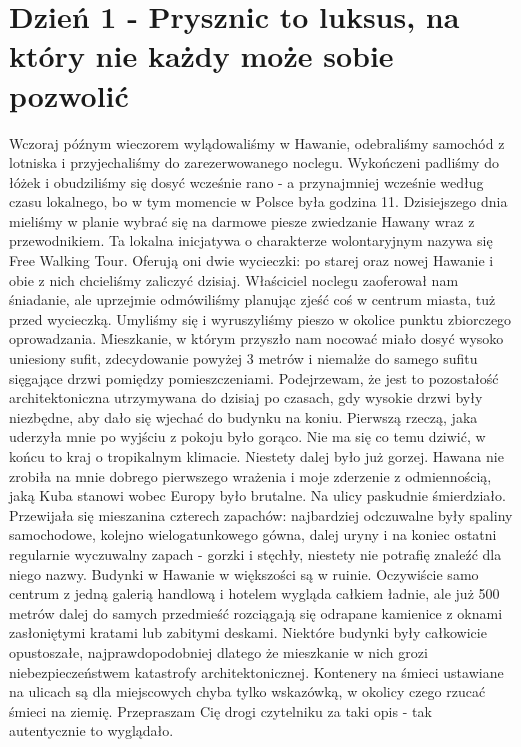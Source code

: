 
\chapter[Prysznic to luksus, na który nie każdy może sobie pozwolić]{Dzień 1 - Prysznic to luksus, na który nie każdy może sobie pozwolić}

Wczoraj późnym wieczorem wylądowaliśmy w Hawanie, odebraliśmy samochód z lotniska i przyjechaliśmy do zarezerwowanego noclegu.
Wykończeni padliśmy do łóżek i obudziliśmy się dosyć wcześnie rano - a przynajmniej wcześnie według czasu lokalnego, bo w tym momencie w Polsce była godzina 11.
Dzisiejszego dnia mieliśmy w planie wybrać się na darmowe piesze zwiedzanie Hawany wraz z przewodnikiem.
Ta lokalna inicjatywa o charakterze wolontaryjnym nazywa się Free Walking Tour.
Oferują oni dwie wycieczki: po starej oraz nowej Hawanie i obie z nich chcieliśmy zaliczyć dzisiaj.
Właściciel noclegu zaoferował nam śniadanie, ale uprzejmie odmówiliśmy planując zjeść coś w centrum miasta, tuż przed wycieczką.
Umyliśmy się i wyruszyliśmy pieszo w okolice punktu zbiorczego oprowadzania.
Mieszkanie, w którym przyszło nam nocować miało dosyć wysoko uniesiony sufit, zdecydowanie powyżej 3 metrów i niemalże do samego sufitu sięgające drzwi pomiędzy pomieszczeniami.
Podejrzewam, że jest to pozostałość architektoniczna utrzymywana do dzisiaj po czasach, gdy wysokie drzwi były niezbędne, aby dało się wjechać do budynku na koniu.
Pierwszą rzeczą, jaka uderzyła mnie po wyjściu z pokoju było gorąco.
Nie ma się co temu dziwić, w końcu to kraj o tropikalnym klimacie.
Niestety dalej było już gorzej.
Hawana nie zrobiła na mnie dobrego pierwszego wrażenia i moje zderzenie z odmiennością, jaką Kuba stanowi wobec Europy było brutalne.
Na ulicy paskudnie śmierdziało.
Przewijała się mieszanina czterech zapachów: najbardziej odczuwalne były spaliny samochodowe, kolejno wielogatunkowego gówna, dalej uryny i na koniec ostatni regularnie wyczuwalny zapach - gorzki i stęchły, niestety nie potrafię znaleźć dla niego nazwy.
Budynki w Hawanie w większości są w ruinie.
Oczywiście samo centrum z jedną galerią handlową i hotelem wygląda całkiem ładnie, ale już 500 metrów dalej do samych przedmieść rozciągają się odrapane kamienice z oknami zasłoniętymi kratami lub zabitymi deskami.
Niektóre budynki były całkowicie opustoszałe, najprawdopodobniej dlatego że mieszkanie w nich grozi niebezpieczeństwem katastrofy architektonicznej.
Kontenery na śmieci ustawiane na ulicach są dla miejscowych chyba tylko wskazówką, w okolicy czego rzucać śmieci na ziemię.
Przepraszam Cię drogi czytelniku za taki opis - tak autentycznie to wyglądało.
